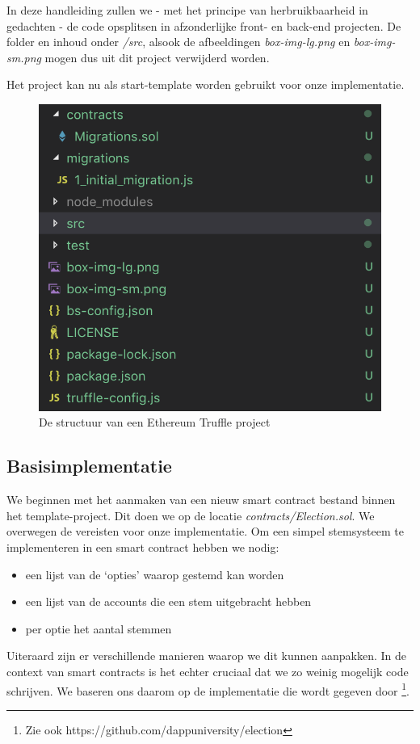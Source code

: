 	In deze handleiding zullen we - met het principe van herbruikbaarheid in gedachten - de code opsplitsen in afzonderlijke front- en back-end projecten. De folder en inhoud onder \textit{\slash src}, alsook de afbeeldingen \textit{box-img-lg.png} en \textit{box-img-sm.png} mogen dus uit dit project verwijderd worden.
	
	Het project kan nu als start-template worden gebruikt voor onze implementatie.
	
	\begin{figure}
		\centering
		\includegraphics[width=\linewidth/2]{img/truffle-template.png}
		\caption{De structuur van een Ethereum Truffle project}
		\label{fig:truffle-template}
	\end{figure}
	
	\subsection{Basisimplementatie}
	We beginnen met het aanmaken van een nieuw smart contract bestand binnen het template-project. Dit doen we op de locatie \textit{contracts\slash Election.sol}. We overwegen de vereisten voor onze implementatie. Om een simpel stemsysteem te implementeren in een smart contract hebben we nodig:
	\begin{itemize}
		\item een lijst van de `opties' waarop gestemd kan worden
		\item een lijst van de accounts die een stem uitgebracht hebben
		\item per optie het aantal stemmen
	\end{itemize}
	Uiteraard zijn er verschillende manieren waarop we dit kunnen aanpakken. In de context van smart contracts is het echter cruciaal dat we zo weinig mogelijk code schrijven. We baseren ons daarom op de implementatie die wordt gegeven door \textcite{McCubin2019}\footnote{Zie ook https://github.com/dappuniversity/election}.
	
